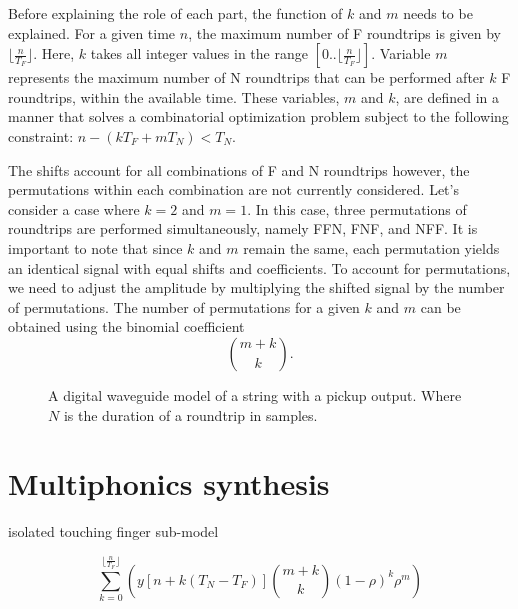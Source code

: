 \documentclass{sigchi}
\begin{document}
Before explaining the role of each part, the function of $k$ and $m$ needs to be explained. For a given time $n$, the maximum number of F roundtrips is given by $\lfloor \frac{n}{T_F} \rfloor$. Here, $k$ takes all integer values in the range $[0..\lfloor \frac{n}{T_F} \rfloor]$. Variable $m$ represents the maximum number of N roundtrips that can be performed after $k$ F roundtrips, within the available time. These variables, $m$ and $k$, are defined in a manner that solves a combinatorial optimization problem subject to the following constraint: $n - (kT_F + mT_N) < T_N$.

The shifts account for all combinations of F and N roundtrips however, the permutations within each combination are not currently considered. Let's consider a case where $k = 2$ and $m = 1$. In this case, three permutations of roundtrips are performed simultaneously, namely FFN, FNF, and NFF. It is important to note that since $k$ and $m$ remain the same, each permutation yields an identical signal with equal shifts and coefficients. To account for permutations, we need to adjust the amplitude by multiplying the shifted signal by the number of permutations. The number of permutations for a given $k$ and $m$ can be obtained using the binomial coefficient
\begin{equation}
	\binom{m+k}{k}.
\end{equation}

\begin{figure}[h]
	\centering
	\scalebox{1}{}
	\caption{A digital waveguide model of a string with a pickup output. Where $N$ is the duration of a roundtrip in samples.}
	\label{fig:triangle}
\end{figure}




\section{Multiphonics synthesis}

isolated touching finger sub-model

\begin{equation}
	\sum_{k=0}^{\lfloor \frac{n}{T_F} \rfloor}\left(y[n + k(T_N-T_F)]\binom{m+k}{k} (1 - \rho)^{k} \rho^m\right)
\end{equation}
\end{document}
